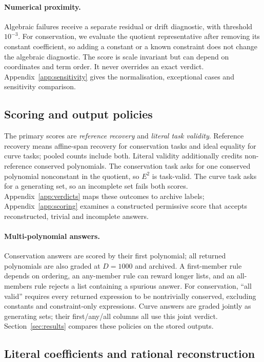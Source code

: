 \documentclass[10pt]{article}
\begin{document}
\paragraph{Numerical proximity.} Algebraic failures receive a separate residual or drift diagnostic, with threshold $10^{-3}$. For conservation, we evaluate the quotient representative after removing its constant coefficient, so adding a constant or a known constraint does not change the algebraic diagnostic. The score is scale invariant but can depend on coordinates and term order. It never overrides an exact verdict. Appendix~\ref{app:sensitivity} gives the normalisation, exceptional cases and sensitivity comparison.

\subsection{Scoring and output policies}

The primary scores are \emph{reference recovery} and \emph{literal task validity}. Reference recovery means affine-span recovery for conservation tasks and ideal equality for curve tasks; pooled counts include both. Literal validity additionally credits non-reference conserved polynomials. The conservation task asks for one conserved polynomial nonconstant in the quotient, so $E^2$ is task-valid. The curve task asks for a generating set, so an incomplete set fails both scores. Appendix~\ref{app:verdicts} maps these outcomes to archive labels; Appendix~\ref{app:scoring} examines a constructed permissive score that accepts reconstructed, trivial and incomplete answers.

\paragraph{Multi-polynomial answers.} Conservation answers are scored by their first polynomial; all returned polynomials are also graded at $D=1000$ and archived. A first-member rule depends on ordering, an any-member rule can reward longer lists, and an all-members rule rejects a list containing a spurious answer. For conservation, ``all valid'' requires every returned expression to be nontrivially conserved, excluding constants and constraint-only expressions. Curve answers are graded jointly as generating sets; their first/any/all columns all use this joint verdict. Section~\ref{sec:results} compares these policies on the stored outputs.

\subsection{Literal coefficients and rational reconstruction}
\end{document}
